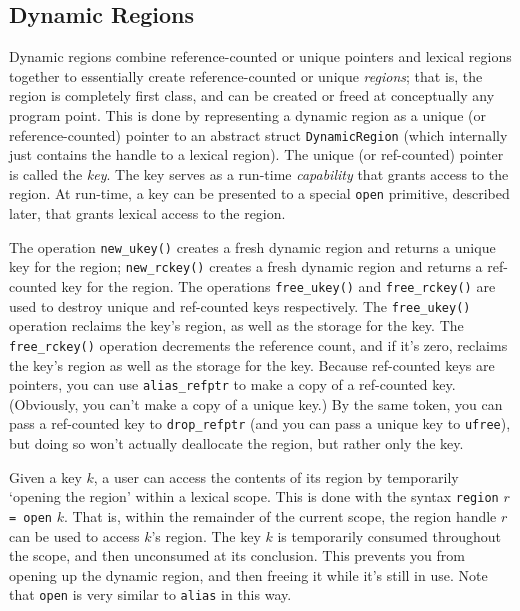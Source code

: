 \subsection{Dynamic Regions}

Dynamic regions combine reference-counted or unique pointers and lexical
regions together to essentially create reference-counted or unique
\emph{regions}; that is, the region is completely first class, and can be
created or freed at conceptually any program point.  This is done by
representing a dynamic region as a unique (or reference-counted) pointer to
an abstract struct \texttt{DynamicRegion} (which internally just contains
the handle to a lexical region).  The unique (or ref-counted) pointer is
called the \emph{key}.  The key serves as a run-time \emph{capability} that
grants access to the region.  At run-time, a key can be presented to a
special \texttt{open} primitive, described later, that grants lexical access
to the region.
        
The operation \texttt{new\_ukey()} creates a fresh dynamic region and returns
a unique key for the region; \texttt{new\_rckey()} creates a fresh dynamic
region and returns a ref-counted key for the region.  The operations
\texttt{free\_ukey()} and \texttt{free\_rckey()} are used to destroy unique
and ref-counted keys respectively.  The \texttt{free\_ukey()} operation
reclaims the key's region, as well as the storage for the key.  The
\texttt{free\_rckey()} operation decrements the reference count, and if it's
zero, reclaims the key's region as well as the storage for the key.  Because
ref-counted keys are pointers, you can use \texttt{alias\_refptr} to make a
copy of a ref-counted key.  (Obviously, you can't make a copy of a unique
key.)  By the same token, you can pass a ref-counted key to
\texttt{drop\_refptr} (and you can pass a unique key to \texttt{ufree}), but
doing so won't actually deallocate the region, but rather only the key.

Given a key $k$, a user can access the contents of its region by temporarily
`opening the region' within a lexical scope.  This is done with the syntax
\verb+region+ $r$ \verb+= open+ $k$.  That is, within the remainder of the
current scope, the region handle $r$ can be used to access $k$'s region.
The key $k$ is temporarily consumed throughout the scope, and then
unconsumed at its conclusion.  This prevents you from opening up the dynamic
region, and then freeing it while it's still in use.  Note that
\texttt{open} is very similar to \texttt{alias} in this way.

